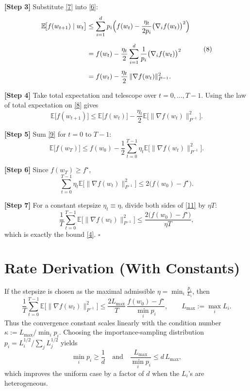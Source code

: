 \documentclass{article}
\newcommand{\E}{\mathbb{E}}
\begin{document}
\noindent\textbf{[Step 3]} Substitute \eqref{7} into \eqref{6}:
\[
\begin{aligned}
\E\!\bigl[f(w_{t+1})\mid w_{t}\bigr]
&\le \sum_{i=1}^{d}p_{i}\Bigl(
      f(w_{t})-\frac{\eta_{t}}{2p_{i}}\bigl(\nabla_{i}f(w_{t})\bigr)^{2}
      \Bigr)\\[2mm]
&= f(w_{t})-\frac{\eta_{t}}{2}\sum_{i=1}^{d}\frac{1}{p_{i}}
      \bigl(\nabla_{i}f(w_{t})\bigr)^{2}\\[2mm]
&= f(w_{t})-\frac{\eta_{t}}{2}\,\|\nabla f(w_{t})\|_{P^{-1}}^{2}.
\end{aligned}
\tag{8}
\]

\noindent\textbf{[Step 4]} Take total expectation and telescope over $t=0,\dots,T-1$.
Using the law of total expectation on \eqref{8} gives
\[
\E\!\bigl[f(w_{t+1})\bigr]
\le \E\!\bigl[f(w_{t})\bigr]
      -\frac{\eta_{t}}{2}\E\!\bigl[\|\nabla f(w_{t})\|_{P^{-1}}^{2}\bigr].
\tag{9}
\]

\noindent\textbf{[Step 5]} Sum \eqref{9} for $t=0$ to $T-1$:
\[
\E\!\bigl[f(w_{T})\bigr]
\le f(w_{0})
      -\frac{1}{2}\sum_{t=0}^{T-1}\eta_{t}
          \E\!\bigl[\|\nabla f(w_{t})\|_{P^{-1}}^{2}\bigr].
\tag{10}
\]

\noindent\textbf{[Step 6]} Since $f(w_{T})\ge f^{\star}$,
\[
\sum_{t=0}^{T-1}\eta_{t}
      \E\!\bigl[\|\nabla f(w_{t})\|_{P^{-1}}^{2}\bigr]
\le 2\bigl(f(w_{0})-f^{\star}\bigr).
\tag{11}
\]

\noindent\textbf{[Step 7]} For a constant stepsize $\eta_{t}\equiv\eta$,
divide both sides of \eqref{11} by $\eta T$:
\[
\frac{1}{T}\sum_{t=0}^{T-1}
   \E\!\bigl[\|\nabla f(w_{t})\|_{P^{-1}}^{2}\bigr]
\le \frac{2\bigl(f(w_{0})-f^{\star}\bigr)}{\eta T},
\]
which is exactly the bound \eqref{4}. $\square$

\section*{Rate Derivation (With Constants)}
If the stepsize is chosen as the maximal admissible
$\eta = \min_{i} \frac{p_{i}}{L_{i}}$, then
\[
\frac{1}{T}\sum_{t=0}^{T-1}
   \E\!\bigl[\|\nabla f(w_{t})\|_{P^{-1}}^{2}\bigr]
\le
\frac{2L_{\max}}{T}\,
\frac{f(w_{0})-f^{\star}}{\min_{i}p_{i}},
\qquad
L_{\max}:=\max_{i}L_{i}.
\]
Thus the convergence constant scales linearly with the
condition number $\kappa:=L_{\max}/\min_{i}p_{i}$.
Choosing the importance‑sampling distribution
$p_{i}=L_{i}^{1/2}/\sum_{j}L_{j}^{1/2}$ yields
\[
\min_{i}p_{i}\ge \frac{1}{d}\quad\text{and}\quad
\frac{L_{\max}}{\min_{i}p_{i}}
\le d\,L_{\max},
\]
which improves the uniform case by a factor of $d$ when the $L_{i}$'s are heterogeneous.
\end{document}
